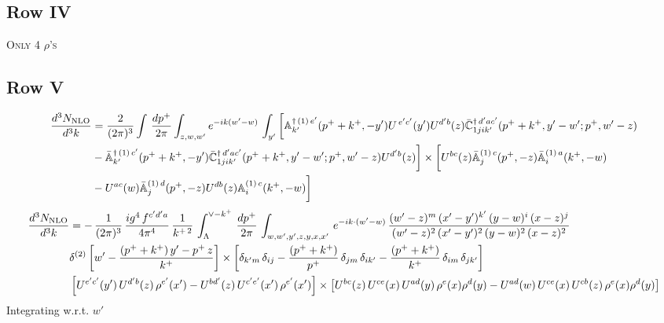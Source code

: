 \documentclass[9pt]{article}
\def\mf#1{\mathbb{#1}}
\numberwithin{equation}{section}
\begin{document}
\subsection{Row IV\,}
\textsc{Only 4 $\rho$'s}
\subsection{Row V\,}
\begin{align}
 \frac{d^{3}N_{\rm NLO}}{d^{3}k} & =   \frac{2}{(2\pi)^{3}} \int\, \frac{dp^{+}}{2\pi}\int_{z,w,w^{\prime}} e^{-ik(w^{\prime}-w)}\,\int_{y^{\prime}}\bigg[\mf{A}^{\dagger\, (1)\,e^{\prime}}_{k^{\prime}}(p^{+}+k^{+},-y^{\prime})U^{\, e^{\prime}c^{\prime}}(y^{\prime})U^{d^{\prime}b}(z) \Bar{\mf{C}}^{\dagger\, d^{\prime}ac^{\prime}}_{1jik^{\prime}}(p^{+}+k^{+},y^{\prime}-w^{\prime}; p^{+},w^{\prime}-z) \notag \\ & -\Bar{\mf{A}}^{\dagger\, (1)\,c^{\prime}}_{k^{\prime}}(p^{+}+k^{+},-y^{\prime}) \Bar{\mf{C}}^{\dagger\, d^{\prime}ac^{\prime}}_{1jik^{\prime}}(p^{+}+k^{+},y^{\prime}-w^{\prime}; p^{+},w^{\prime}-z)U^{d^{\prime}b}(z)\bigg] \times  \bigg[U^{bc}(z)\Bar{\mf{A}}^{(1)\, c}_{j}(p^{+},-z)\Bar{\mf{A}}^{(1)\, a}_{i}(k^{+},-w)\notag \\ & -U^{ac}(w) \Bar{\mf{A}}^{(1)\, d}_{j}(p^{+},-z)U^{db}(z) \mf{A}^{(1)\, c}_{i}(k^{+},- w)\bigg]\nonumber
\end{align}
\begin{align}
     \frac{d^{3}N_{\rm NLO}}{d^{3}k} & = -\, \frac{1}{(2\pi)^{3}}\,\frac{ig^{4}\,f^{c'd'a}}{4\pi^{4}}\, \frac{1}{k^{+\,2}}\,\int_{\Lambda}^{\vee-k^{+}}\, \frac{dp^{+}}{2\pi}\, \int_{w,w',y',z,y,x,x'}\, e^{-ik\cdot (w'-w)}\, \frac{(w'-z)^{m}\,(x'-y')^{k'}\,(y-w)^{i}\,(x-z)^{j}}{(w'-z)^{2}\,(x'-y')^{2}\,(y-w)^{2}\,(x-z)^{2}}\notag \\ & \delta^{(2)}\left[w'-\frac{(p^{+}+k^{+})\,y'-p^{+}\,z}{k^{+}}\right]\times \left[\delta_{k'm}\,\delta_{ij}-\frac{(p^{+}+k^{+})}{p^{+}}\,\delta_{jm}\,\delta_{ik'}-\frac{(p^{+}+k^{+})}{k^{+}}\, \delta_{im}\, \delta_{jk'}\right]\notag \\ & \left[U^{e'c'}(y')\,U^{d'b}(z)\,\rho^{e'}(x')-U^{bd'}(z)\,U^{c'e'}(x')\,\rho^{e'}(x')\right]\times \left[U^{bc}(z)\,U^{ce}(x)\,U^{ad}(y)\,\rho^{e}(x)\rho^{d}(y)-U^{ad}(w)\,U^{ce}(x)\,U^{cb}(z)\,\rho^{e}(x)\rho^{d}(y)\right]
\end{align}
Integrating w.r.t. $w'$
\end{document}
